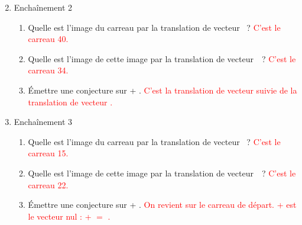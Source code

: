 \begin{enumerate}
	\setcounter{enumi}{1}
	\item Enchaînement 2
	\vspace{-2em}
		\begin{enumerate}
			\item Quelle est l'image du carreau  par la translation de vecteur ~? \textcolor{red}{C'est le carreau 40.}
			\item Quelle est l'image de cette image par la translation de vecteur~~?
				 \textcolor{red}{C'est le carreau 34.}
			\item Émettre une conjecture sur  + . \textcolor{red}{C'est la translation de vecteur  suivie de la translation de vecteur .}
		\end{enumerate}
	\item Enchaînement 3
	\vspace{-2em}
		\begin{enumerate}
			\item Quelle est l'image du carreau  par la translation de vecteur ~? \textcolor{red}{C'est le carreau 15.}
			\item Quelle est l'image de cette image par la translation de vecteur~~?
				 \textcolor{red}{C'est le carreau 22.}
			\item Émettre une conjecture sur  + . \textcolor{red}{On revient sur le carreau de départ.  +  est le vecteur nul :   +  $=$ .}
		\end{enumerate}
\end{enumerate}